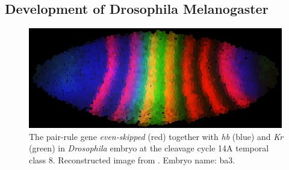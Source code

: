 \documentclass[12pt,a4paper,twoside,openright]{book}
\begin{document}
\subsection{Development of Drosophila Melanogaster}

\begin{figure}
\centering
\includegraphics[width=0.99\textwidth]{img/drosophila}
\caption[Drosophila Melanogaster embryo at the cleavage cycle 14A temporal class 8]{The pair-rule gene  \emph{even-skipped} (red) together with \emph{hb} (blue) and \emph{Kr} (green) in \emph{Drosophila} embryo at the cleavage cycle 14A temporal class 8. Reconstructed image from \cite{flyex2009}. Embryo name: ba3. }
\label{fig:drosophila}       %
\end{figure}
\end{document}
